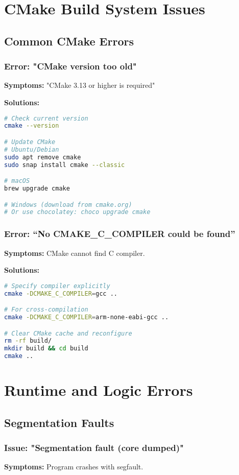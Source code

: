 \documentclass[11pt,a4paper]{article}
\begin{document}
\section{CMake Build System Issues}

\subsection{Common CMake Errors}

\subsubsection{Error: "CMake version too old"}
\textbf{Symptoms:} "CMake 3.13 or higher is required"

\textbf{Solutions:}
\begin{lstlisting}[language=bash]
# Check current version
cmake --version

# Update CMake
# Ubuntu/Debian
sudo apt remove cmake
sudo snap install cmake --classic

# macOS
brew upgrade cmake

# Windows (download from cmake.org)
# Or use chocolatey: choco upgrade cmake
\end{lstlisting}

\subsubsection{Error: ``No CMAKE\_C\_COMPILER could be found''}
\textbf{Symptoms:} CMake cannot find C compiler.

\textbf{Solutions:}
\begin{lstlisting}[language=bash]
# Specify compiler explicitly
cmake -DCMAKE_C_COMPILER=gcc ..

# For cross-compilation
cmake -DCMAKE_C_COMPILER=arm-none-eabi-gcc ..

# Clear CMake cache and reconfigure
rm -rf build/
mkdir build && cd build
cmake ..
\end{lstlisting}

\section{Runtime and Logic Errors}

\subsection{Segmentation Faults}

\subsubsection{Issue: "Segmentation fault (core dumped)"}
\textbf{Symptoms:} Program crashes with segfault.
\end{document}
